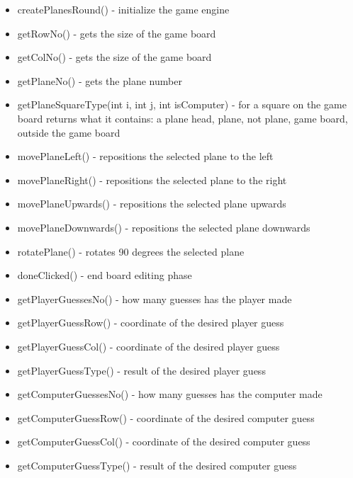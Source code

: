 \begin{itemize}
	\item createPlanesRound() - initialize the game engine
	
	\item getRowNo() - gets the size of the game board
	\item getColNo() - gets the size of the game board
	\item getPlaneNo() - gets the plane number 
	\item getPlaneSquareType(int i, int j, int isComputer) - for a square on the game board returns what it contains: a plane head, plane, not plane, game board, outside the game board
	
	\item movePlaneLeft() - repositions the selected plane to the left
	\item movePlaneRight() - repositions the selected plane to the right
	\item movePlaneUpwards() - repositions the selected plane upwards
	\item movePlaneDownwards() - repositions the selected plane downwards
	\item rotatePlane() - rotates 90 degrees the selected plane
	\item doneClicked() - end board editing phase 
	
	\item getPlayerGuessesNo() - how many guesses has the player made
	\item getPlayerGuessRow() - coordinate of the desired player guess
	\item getPlayerGuessCol() - coordinate of the desired player guess
	\item getPlayerGuessType() - result of the desired player guess
	
	\item getComputerGuessesNo() - how many guesses has the computer made
	\item getComputerGuessRow() - coordinate of the desired computer guess
	\item getComputerGuessCol() -  coordinate of the desired computer guess
	\item getComputerGuessType() - 	result of the desired computer guess
	

\end{itemize}
